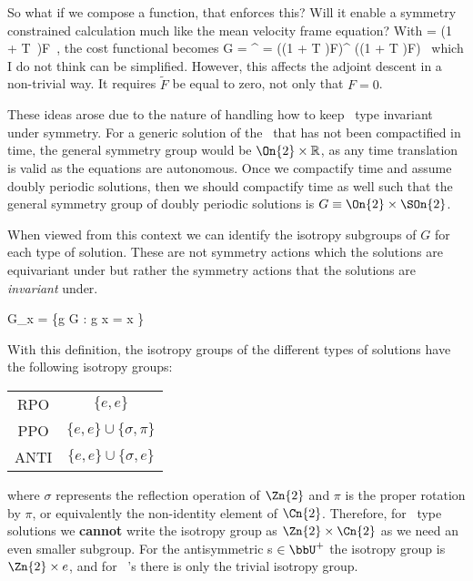 So what if we compose a function, that enforces this? Will it enable a symmetry
constrained calculation much like the mean velocity frame equation? With
\beq
{} = (1 + T \circ \Refl\,\circ)F \,,
the cost functional becomes
\beq
G = ^{\dagger} 
  =  ((1 + T \circ \Refl \circ)F)^{\dagger} ((1 + T \circ \Refl \circ)F) \,
which I do not think can be simplified. However, this affects the adjoint
descent in a non-trivial way. It requires $\tilde{F}$ be equal to zero, not
only that $F=0$.

\renewcommand{\Refl}{\ensuremath{\sigma}}



These ideas arose due to the nature of handling how to keep \ppo\ type {\twots} invariant
under symmetry. For a generic solution of the \KSe\ that has not been compactified in time, the general
symmetry group would be $\On{2} \times \mathbb{R}$, as any time translation is valid as the equations
are autonomous. Once we compactify time and assume doubly periodic solutions, then we should compactify
time as well such that the general symmetry group of doubly periodic solutions is $ G \equiv \On{2} \times \SOn{2}$.

When viewed from this context we can identify the isotropy subgroups of $G$ for each type of solution.
These are not symmetry actions which the solutions are equivariant under but rather the symmetry actions
that the solutions are \emph{invariant} under.

\beq
G_{x} = \{g \in G : g x = x \}

With this definition, the isotropy groups of the different types of solutions have the following isotropy
groups:
\begin{table}[h!]
\centering
\begin{tabular}{c|c}
\hline
RPO & $\{ e, e \}$ \\
PPO & $\{ e, e \} \cup \{ \sigma, \pi \}$ \\
ANTI & $\{ e, e \} \cup \{\sigma, e \}$ \\
\hline
\end{tabular}
\end{table}
where $\sigma$ represents the reflection operation of $\Zn{2}$ and $\pi$ is
the proper rotation by $\pi$, or equivalently the non-identity element of
$\Cn{2}$. Therefore, for \ppo\, type solutions we \textbf{cannot} write the
isotropy group as $\Zn{2}\times\Cn{2}$ as we need an even smaller subgroup.
For the antisymmetric \po s $\in\bbU^+$ the isotropy group is
$\Zn{2}\times{e}$, and for \rpo\, 's there is only the trivial isotropy
group.

